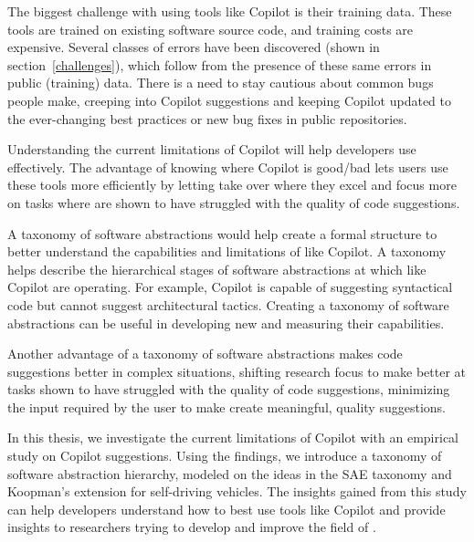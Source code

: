 The biggest challenge with using tools like Copilot is their training data. 
These tools are trained on existing software source code, and training costs are expensive.
Several classes of errors have been discovered (shown in section~\ref{challenges}), which follow from the presence of these same errors in public (training) data. 
There is a need to stay cautious about common bugs people make, creeping into Copilot suggestions and keeping Copilot updated to the ever-changing best practices or new bug fixes in public repositories.

Understanding the current limitations of Copilot will help developers use \cct{} effectively. 
The advantage of knowing where Copilot is good/bad lets users use these tools more efficiently by letting \cct{} take over where they excel and focus more on tasks where \cct{} are shown to have struggled with the quality of code suggestions.

A taxonomy of software abstractions would help create a formal structure to better understand the capabilities and limitations of \cct{} like Copilot. 
A taxonomy helps describe the hierarchical stages of software abstractions at which \cct{} like Copilot are operating. 
For example, Copilot is capable of suggesting syntactical code but cannot suggest architectural tactics.
Creating a taxonomy of software abstractions can be useful in developing new \cct{} and measuring their capabilities.

Another advantage of a taxonomy of software abstractions makes code suggestions better in complex situations, shifting research focus to make \cct{} better at tasks shown to have struggled with the quality of code suggestions, minimizing the input required by the user to make \cct{} create meaningful, quality suggestions.

In this thesis, we investigate the current limitations of Copilot with an empirical study on Copilot suggestions. Using the findings, we introduce a taxonomy of software abstraction hierarchy, modeled on the ideas in the SAE taxonomy and Koopman's extension for self-driving vehicles. The insights gained from this study can help developers understand how to best use tools like Copilot and provide insights to researchers trying to develop and improve the field of \cct{}.




